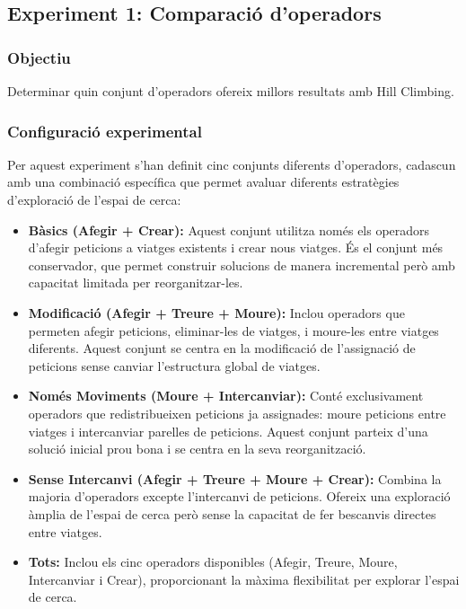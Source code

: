 \subsection{Experiment 1: Comparació d'operadors}

\vspace{0.75cm}

\subsubsection{Objectiu}
Determinar quin conjunt d'operadors ofereix millors resultats amb Hill Climbing.

\subsubsection{Configuració experimental}

Per aquest experiment s'han definit cinc conjunts diferents d'operadors, cadascun amb una combinació específica que permet avaluar diferents estratègies d'exploració de l'espai de cerca:

\begin{itemize}
    \item \textbf{Bàsics (Afegir + Crear):} Aquest conjunt utilitza només els operadors d'afegir peticions a viatges existents i crear nous viatges. És el conjunt més conservador, que permet construir solucions de manera incremental però amb capacitat limitada per reorganitzar-les.
    
    \item \textbf{Modificació (Afegir + Treure + Moure):} Inclou operadors que permeten afegir peticions, eliminar-les de viatges, i moure-les entre viatges diferents. Aquest conjunt se centra en la modificació de l'assignació de peticions sense canviar l'estructura global de viatges.
    
    \item \textbf{Només Moviments (Moure + Intercanviar):} Conté exclusivament operadors que redistribueixen peticions ja assignades: moure peticions entre viatges i intercanviar parelles de peticions. Aquest conjunt parteix d'una solució inicial prou bona i se centra en la seva reorganització.
    
    \item \textbf{Sense Intercanvi (Afegir + Treure + Moure + Crear):} Combina la majoria d'operadors excepte l'intercanvi de peticions. Ofereix una exploració àmplia de l'espai de cerca però sense la capacitat de fer bescanvis directes entre viatges.
    
    \item \textbf{Tots:} Inclou els cinc operadors disponibles (Afegir, Treure, Moure, Intercanviar i Crear), proporcionant la màxima flexibilitat per explorar l'espai de cerca.
\end{itemize}


